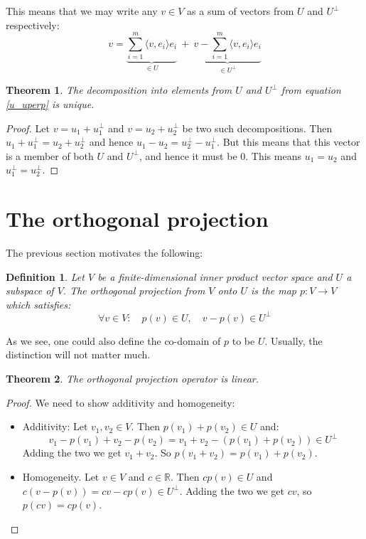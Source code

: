 \documentclass[12pt, a4paper]{article}
\newtheorem{theorem}{Theorem}[section]
\newtheorem{definition}{Definition}[section]
\numberwithin{equation}{section}
\begin{document}
This means that we may write any $v\in V$ as a sum of vectors from $U$ and $U^\perp$ respectively:
\begin{equation}
\label{u_uperp}
v=\underbrace{\sum_{i=1}^m\langle v,e_i\rangle e_i}_{\in U}\ +\ \underbrace{v-\sum_{i=1}^m\langle v,e_i\rangle e_i}_{\in U^\perp}
\end{equation}

\begin{theorem}
The decomposition into elements from $U$ and $U^\perp$ from equation \ref{u_uperp} is unique.
\end{theorem}
\begin{proof}
Let $v=u_1+u^\perp_1$ and $v=u_2+u^\perp_2$ be two such decompositions. Then $u_1+u^\perp_1=u_2+u^\perp_2$ and hence $u_1-u_2=u^\perp_2-u^\perp_1$. But this means that this vector is a member of both $U$ and $U^\perp$, and hence it must be $0$. This means $u_1=u_2$ and $u^\perp_1=u^\perp_2$.
\end{proof}

\section{The orthogonal projection}
The previous section motivates the following:
\begin{definition}
Let $V$ be a finite-dimensional inner product vector space and $U$ a subspace of $V$. The orthogonal projection from $V$ onto $U$ is the map $p:V\rightarrow V$ which satisfies:
\begin{equation}
\forall v\in V:\quad p(v)\in U,\quad v-p(v)\in U^\perp
\end{equation}
\end{definition}
As we see, one could also define the co-domain of $p$ to be $U$. Usually, the distinction will not matter much.

\begin{theorem}
The orthogonal projection operator is linear.
\end{theorem}
\begin{proof}
We need to show additivity and homogeneity:
\begin{itemize}
\item Additivity: Let $v_1,v_2\in V$. Then $p(v_1)+p(v_2)\in U$ and:
\begin{equation}
v_1-p(v_1)+v_2-p(v_2)=v_1+v_2-(p(v_1)+p(v_2))\in U^\perp
\end{equation}
Adding the two we get $v_1+v_2$. So $p(v_1+v_2)=p(v_1)+p(v_2)$.
\item Homogeneity. Let $v\in V$ and $c\in\mathbb{R}$. Then $cp(v)\in U$ and $c(v-p(v))=cv-cp(v)\in U^\perp$. Adding the two we get $cv$, so $p(cv)=cp(v)$. 
\end{itemize}
\end{proof}
\end{document}
